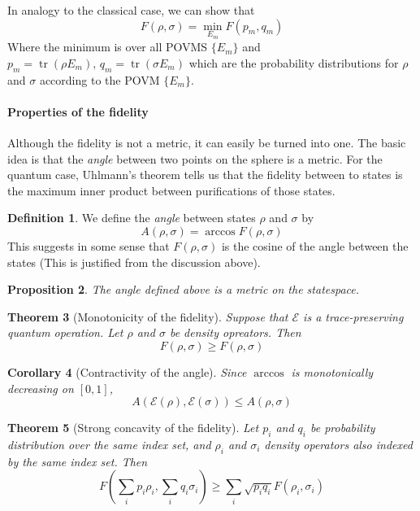 \documentclass[11pt,a4paper]{article}
\theoremstyle{definition}
\newtheorem{definition}{Definition}[section]
\theoremstyle{plain}
\newtheorem{theorem}[definition]{Theorem}
\newtheorem{proposition}[definition]{Proposition}
\newtheorem{corollary}[definition]{Corollary}
\theoremstyle{remark}
\begin{document}
In analogy to the classical case, we can show that 
$$F(\rho, \sigma) = \min_{E_m} F(p_m, q_m)$$
Where the minimum is over all POVMS $\{E_m\}$ and $p_m = \operatorname{tr}(\rho E_m), \, q_m = \operatorname{tr}(\sigma E_m)$ which are the 
probability distributions for $\rho$ and $\sigma$ according to the POVM $\{E_m\}$. 

\paragraph{Properties of the fidelity} Although the fidelity is not a metric, it can easily be turned into one. 
The basic idea is that the \emph{angle} between two points on the sphere is a metric. For the quantum case, Uhlmann's theorem tells us that the 
fidelity between to states is the maximum inner product between purifications of those states. 

\begin{definition}
We define the \emph{angle} between states $\rho$ and $\sigma$ by 
$$A(\rho, \sigma) = \arccos F(\rho, \sigma)$$
This suggests in some sense that $F(\rho, \sigma)$ is the cosine of the angle between the states 
(This is justified from the discussion above). 
\end{definition}

\begin{proposition}
The angle defined above is a metric on the statespace. 
\end{proposition}

\begin{theorem}[Monotonicity of the fidelity]\label{thm:Monotonicity-fidelity}
Suppose that $\mathcal{E}$ is a trace-preserving quantum operation. Let $\rho$ and $\sigma$ be density opreators. Then 
$$F(\mathcal{\rho}, \mathcal{\sigma}) \geq F(\rho, \sigma)$$
\end{theorem}

\begin{corollary}[Contractivity of the angle]\label{thm:contractivity-angle}
Since $\arccos$ is monotonically decreasing on $[0,1]$, 
$$A(\mathcal{E}(\rho), \mathcal{E}(\sigma)) \leq A(\rho, \sigma)$$
\end{corollary}

\begin{theorem}[Strong concavity of the fidelity]\label{thm:strong-concavity-fidelity}
Let $p_i$ and $q_i$ be probability distribution over the same index set, and $\rho_i$ and $\sigma_i$ density operators also indexed by the same index set. Then 
$$F \left(\sum_i p_i \rho_i, \sum_i q_i \sigma_i\right) \geq \sum_i \sqrt{p_i q_i} F(\rho_i, \sigma_i)$$
\end{theorem}
\end{document}
